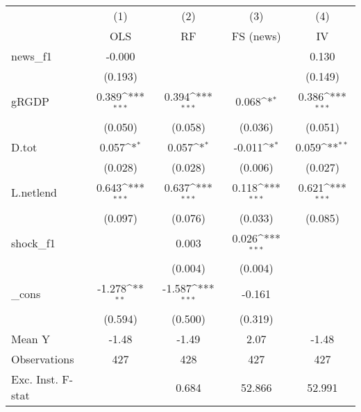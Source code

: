 {
\def\sym#1{\ifmmode^{#1}\else\(^{#1}\)\fi}
\begin{tabular}{l*{4}{c}}
\toprule
            &\multicolumn{1}{c}{(1)}&\multicolumn{1}{c}{(2)}&\multicolumn{1}{c}{(3)}&\multicolumn{1}{c}{(4)}\\
            &\multicolumn{1}{c}{OLS}&\multicolumn{1}{c}{RF}&\multicolumn{1}{c}{FS (news)}&\multicolumn{1}{c}{IV}\\
\midrule
news\_f1     &      -0.000         &                     &                     &       0.130         \\
            &     (0.193)         &                     &                     &     (0.149)         \\
\addlinespace
gRGDP       &       0.389\sym{***}&       0.394\sym{***}&       0.068\sym{*}  &       0.386\sym{***}\\
            &     (0.050)         &     (0.058)         &     (0.036)         &     (0.051)         \\
\addlinespace
D.tot       &       0.057\sym{*}  &       0.057\sym{*}  &      -0.011\sym{*}  &       0.059\sym{**} \\
            &     (0.028)         &     (0.028)         &     (0.006)         &     (0.027)         \\
\addlinespace
L.netlend   &       0.643\sym{***}&       0.637\sym{***}&       0.118\sym{***}&       0.621\sym{***}\\
            &     (0.097)         &     (0.076)         &     (0.033)         &     (0.085)         \\
\addlinespace
shock\_f1    &                     &       0.003         &       0.026\sym{***}&                     \\
            &                     &     (0.004)         &     (0.004)         &                     \\
\addlinespace
\_cons      &      -1.278\sym{**} &      -1.587\sym{***}&      -0.161         &                     \\
            &     (0.594)         &     (0.500)         &     (0.319)         &                     \\
\midrule
Mean Y      &       -1.48         &       -1.49         &        2.07         &       -1.48         \\
Observations&         427         &         428         &         427         &         427         \\
Exc. Inst. F-stat&                     &       0.684         &      52.866         &      52.991         \\
\bottomrule
\end{tabular}
}
